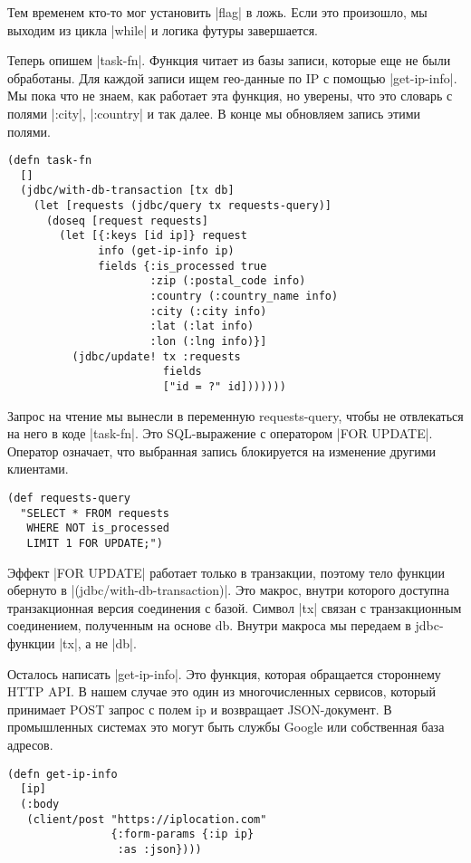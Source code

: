 Тем временем кто-то мог установить \spverb|flag| в ложь. Если это произошло, мы выходим
из цикла \spverb|while| и логика футуры завершается.

Теперь опишем \spverb|task-fn|. Функция читает из базы записи, которые еще не были
обработаны. Для каждой записи ищем гео-данные по IP с помощью \spverb|get-ip-info|. Мы
пока что не знаем, как работает эта функция, но уверены, что это словарь с
полями \spverb|:city|, \spverb|:country| и так далее. В конце мы обновляем запись этими
полями.

\begin{verbatim}
(defn task-fn
  []
  (jdbc/with-db-transaction [tx db]
    (let [requests (jdbc/query tx requests-query)]
      (doseq [request requests]
        (let [{:keys [id ip]} request
              info (get-ip-info ip)
              fields {:is_processed true
                      :zip (:postal_code info)
                      :country (:country_name info)
                      :city (:city info)
                      :lat (:lat info)
                      :lon (:lng info)}]
          (jdbc/update! tx :requests
                        fields
                        ["id = ?" id]))))))
\end{verbatim}

Запрос на чтение мы вынесли в переменную requests-query, чтобы не отвлекаться на
него в коде \spverb|task-fn|. Это SQL-выражение с оператором \spverb|FOR UPDATE|. Оператор
означает, что выбранная запись блокируется на изменение другими клиентами.

\begin{verbatim}
(def requests-query
  "SELECT * FROM requests
   WHERE NOT is_processed
   LIMIT 1 FOR UPDATE;")
\end{verbatim}

Эффект \spverb|FOR UPDATE| работает только в транзакции, поэтому тело функции обернуто
в \spverb|(jdbc/with-db-transaction)|. Это макрос, внутри которого доступна
транзакционная версия соединения с базой. Символ \spverb|tx| связан с транзакционным
соединением, полученным на основе db. Внутри макроса мы передаем в jdbc-функции
\spverb|tx|, а не \spverb|db|.

Осталось написать \spverb|get-ip-info|. Это функция, которая обращается стороннему HTTP
API. В нашем случае это один из многочисленных сервисов, который принимает POST
запрос с полем ip и возвращает JSON-документ. В промышленных системах это могут
быть службы Google или собственная база адресов.

\begin{verbatim}
(defn get-ip-info
  [ip]
  (:body
   (client/post "https://iplocation.com"
                {:form-params {:ip ip}
                 :as :json})))
\end{verbatim}


